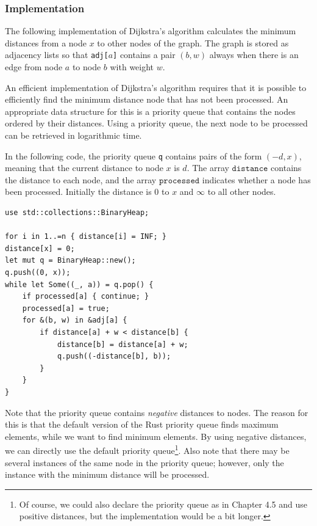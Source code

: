 \subsubsection{Implementation}

The following implementation of Dijkstra's algorithm
calculates the minimum distances from a node $x$
to other nodes of the graph.
The graph is stored as adjacency lists
so that \texttt{adj[$a$]} contains a pair $(b,w)$
always when there is an edge from node $a$ to node $b$
with weight $w$.

An efficient implementation of Dijkstra's algorithm
requires that it is possible to efficiently find the
minimum distance node that has not been processed.
An appropriate data structure for this is a priority queue
that contains the nodes ordered by their distances.
Using a priority queue, the next node to be processed
can be retrieved in logarithmic time.

In the following code, the priority queue
\texttt{q} contains pairs of the form $(-d,x)$,
meaning that the current distance to node $x$ is $d$.
The array $\texttt{distance}$ contains the distance to
each node, and the array $\texttt{processed}$ indicates
whether a node has been processed.
Initially the distance is $0$ to $x$ and $\infty$ to all other nodes.

\begin{lstlisting}
use std::collections::BinaryHeap;

for i in 1..=n { distance[i] = INF; }
distance[x] = 0;
let mut q = BinaryHeap::new();
q.push((0, x));
while let Some((_, a)) = q.pop() {
    if processed[a] { continue; }
    processed[a] = true;
    for &(b, w) in &adj[a] {
        if distance[a] + w < distance[b] {
            distance[b] = distance[a] + w;
            q.push((-distance[b], b));
        }
    }
}
\end{lstlisting}

Note that the priority queue contains \emph{negative}
distances to nodes.
The reason for this is that the
default version of the Rust priority queue finds maximum
elements, while we want to find minimum elements.
By using negative distances,
we can directly use the default priority queue\footnote{Of
course, we could also declare the priority queue as in Chapter 4.5
and use positive distances, but the implementation would be a bit longer.}.
Also note that there may be several instances of the same
node in the priority queue; however, only the instance with the
minimum distance will be processed.

